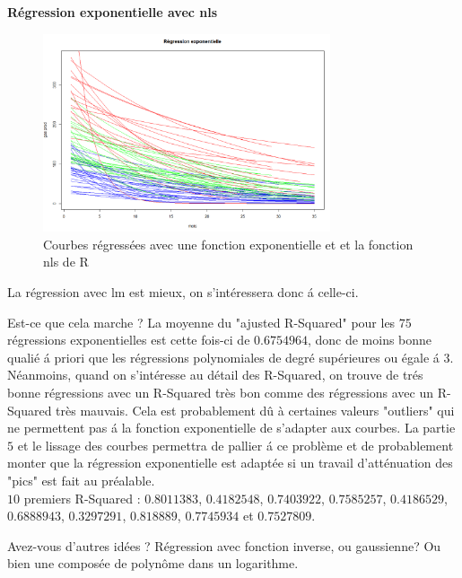 \documentclass[12pt]{article}
\begin{document}
\textbf{R\'egression exponentielle avec nls}

\begin{figure}[H]
 \centering %
	\includegraphics[width=320px]{reg_exp_2}
  \caption{\label{fig:exponential_reg_nls} Courbes r\'egress\'ees avec une fonction exponentielle et et la fonction nls de R}
\end{figure}

La r\'egression avec lm est mieux, on s'int\'eressera donc \'a celle-ci.

Est-ce que cela marche ?
\newline 
La moyenne du "ajusted R-Squared" pour les $75$ r\'egressions exponentielles est cette fois-ci de $0.6754964$, donc de moins bonne quali\'e \'a priori que les r\'egressions polynomiales de degr\'e sup\'erieures ou \'egale \'a $3$. 
\newline
N\'eanmoins, quand on s'int\'eresse au d\'etail des R-Squared, on trouve de tr\'es bonne r\'egressions avec un R-Squared tr\`es bon comme des r\'egressions avec un R-Squared tr\`es mauvais. Cela est probablement d\^u à certaines valeurs "outliers" qui ne permettent pas \'a la fonction exponentielle de s'adapter aux courbes. 
\newline
La partie $5$ et le lissage des courbes permettra de pallier \'a ce probl\`eme et de probablement monter que la r\'egression exponentielle est adapt\'ee si un travail d'att\'enuation des "pics" est fait au pr\'ealable.
\newline
~\\
$10$ premiers R-Squared : 
\newline
$0.8011383$, $0.4182548$, $0.7403922$, $0.7585257$, $0.4186529$, $0.6888943$, $0.3297291$, $0.818889$, $0.7745934$ et $0.7527809$.

Avez-vous d'autres id\'ees ?
\newline
R\'egression avec fonction inverse, ou gaussienne? 
\newline
Ou bien une compos\'ee de polyn\^ome dans un logarithme.
\end{document}
